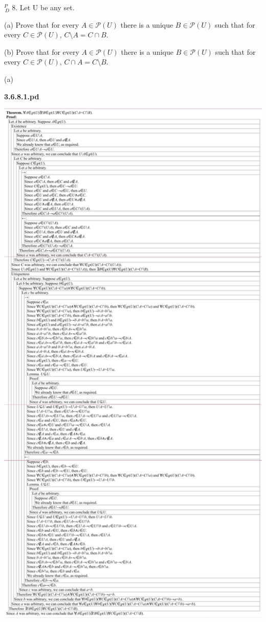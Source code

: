 \documentclass{article}
\begin{document}
\vspace{30pt}

$^{\textit{P}}_{\, \textit{D}}$ 8. Let U be any set.

\hspace{12pt}(a) Prove that for every $A \in \mathcal{P} (U)$ there is a unique $B \in \mathcal{P} (U)$ such
that for every $C \in \mathcal{P} (U)$, $C \setminus A = C \cap B$.

\hspace{12pt}(b) Prove that for every $A \in \mathcal{P} (U)$ there is a unique $B \in \mathcal{P} (U)$ such
that for every $C \in \mathcal{P} (U)$, $C \cap A = C \setminus B$.

\vspace{30pt}

(a)

\textbf{3.6.8.1.pd}
\vspace{10pt}

\includegraphics[scale=0.25]{3_6_8_1}
\end{document}

